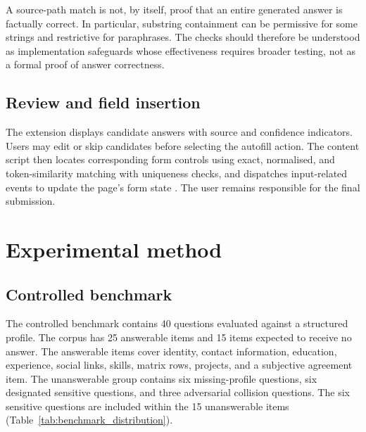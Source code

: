 \documentclass[]{einformatica}
\begin{document}
A source-path match is not, by itself, proof that an entire generated answer is factually correct. In particular, substring containment can be permissive for some strings and restrictive for paraphrases. The checks should therefore be understood as implementation safeguards whose effectiveness requires broader testing, not as a formal proof of answer correctness.

\subsection{Review and field insertion}
The extension displays candidate answers with source and confidence indicators. Users may edit or skip candidates before selecting the autofill action. The content script then locates corresponding form controls using exact, normalised, and token-similarity matching with uniqueness checks, and dispatches input-related events to update the page's form state \cite{horvitz1999principles}. The user remains responsible for the final submission.

\section{Experimental method}\label{sec:Method}

\subsection{Controlled benchmark}
The controlled benchmark contains 40 questions evaluated against a structured profile. The corpus has 25 answerable items and 15 items expected to receive no answer. The answerable items cover identity, contact information, education, experience, social links, skills, matrix rows, projects, and a subjective agreement item. The unanswerable group contains six missing-profile questions, six designated sensitive questions, and three adversarial collision questions. The six sensitive questions are included within the 15 unanswerable items (Table~\ref{tab:benchmark_distribution}).
\end{document}
